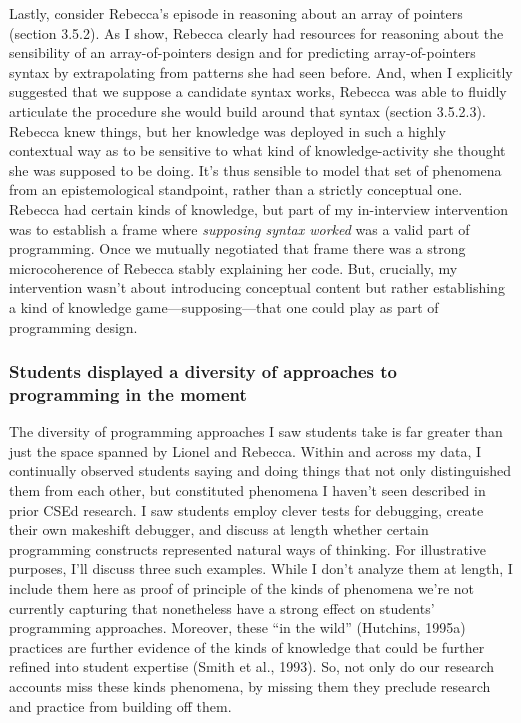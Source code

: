 Lastly, consider Rebecca's episode in reasoning about an array of
pointers (section 3.5.2). As I show, Rebecca clearly had resources for
reasoning about the sensibility of an array-of-pointers design and for
predicting array-of-pointers syntax by extrapolating from patterns she
had seen before. And, when I explicitly suggested that we suppose a
candidate syntax works, Rebecca was able to fluidly articulate the
procedure she would build around that syntax (section 3.5.2.3). Rebecca
knew things, but her knowledge was deployed in such a highly contextual
way as to be sensitive to what kind of knowledge-activity she thought
she was supposed to be doing. It's thus sensible to model that set of
phenomena from an epistemological standpoint, rather than a strictly
conceptual one. Rebecca had certain kinds of knowledge, but part of my
in-interview intervention was to establish a frame where \emph{supposing
syntax worked} was a valid part of programming. Once we mutually
negotiated that frame there was a strong microcoherence of Rebecca
stably explaining her code. But, crucially, my intervention wasn't about
introducing conceptual content but rather establishing a kind of
knowledge game---supposing---that one could play as part of programming
design.

\subsubsection{Students displayed a diversity of approaches to
programming in the
moment}\label{students-displayed-a-diversity-of-approaches-to-programming-in-the-moment}

The diversity of programming approaches I saw students take is far
greater than just the space spanned by Lionel and Rebecca. Within and
across my data, I continually observed students saying and doing things
that not only distinguished them from each other, but constituted
phenomena I haven't seen described in prior CSEd research. I saw
students employ clever tests for debugging, create their own makeshift
debugger, and discuss at length whether certain programming constructs
represented natural ways of thinking. For illustrative purposes, I'll
discuss three such examples. While I don't analyze them at length, I
include them here as proof of principle of the kinds of phenomena we're
not currently capturing that nonetheless have a strong effect on
students' programming approaches. Moreover, these ``in the wild''
(Hutchins, 1995a) practices are further evidence of the kinds of
knowledge that could be further refined into student expertise (Smith et
al., 1993). So, not only do our research accounts miss these kinds
phenomena, by missing them they preclude research and practice from
building off them.


